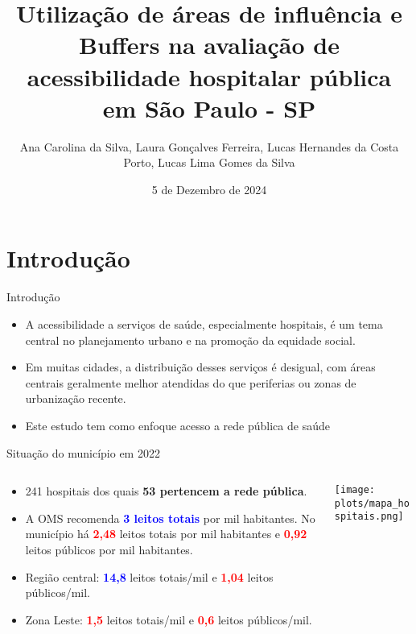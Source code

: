 \documentclass{beamer}
\title{Utilização de áreas de influência e Buffers na avaliação de acessibilidade hospitalar pública em São Paulo - SP}
\author{Ana Carolina da Silva, Laura Gonçalves Ferreira,  Lucas Hernandes da Costa Porto, Lucas Lima Gomes da Silva}
\institute{Universidade de São Paulo}
\date{5 de Dezembro de 2024} %
\begin{document}
\begin{frame}
    \titlepage
\end{frame}


\section{Introdução}
\begin{frame}{Introdução}
            \begin{itemize}
                \item A acessibilidade a serviços de saúde, especialmente hospitais, é um tema central no planejamento urbano e na promoção da equidade social.
                \item Em muitas cidades, a distribuição desses serviços é desigual, com áreas centrais geralmente melhor atendidas do que periferias ou zonas de urbanização recente.
                \item Este estudo tem como enfoque acesso a rede pública de saúde
            \end{itemize}

\end{frame}

\begin{frame}{Situação do município em 2022}
    \begin{columns}
        \begin{column}{0.6\textwidth}
            \begin{itemize}
                \item 241 hospitais dos quais \textbf{53 pertencem a rede pública}.
                \item A OMS recomenda \textbf{\textcolor{blue}{3 leitos totais}} por mil habitantes. No município há \textbf{\textcolor{red}{2,48}} leitos totais por mil habitantes e \textbf{\textcolor{red}{0,92}} leitos públicos por mil habitantes. 
                \item Região central: \textbf{\textcolor{blue}{14,8}} leitos totais/mil e \textbf{\textcolor{red}{1,04}} leitos públicos/mil.
                \item Zona Leste: \textbf{\textcolor{red}{1,5}} leitos totais/mil e \textbf{\textcolor{red}{0,6}} leitos públicos/mil.
            \end{itemize}
        \end{column}

        \begin{column}{0.4\textwidth}
            \centering
            \texttt{[image: plots/mapa\_hospitais.png]} 
        \end{column}
    \end{columns}
\end{frame}
\end{document}
